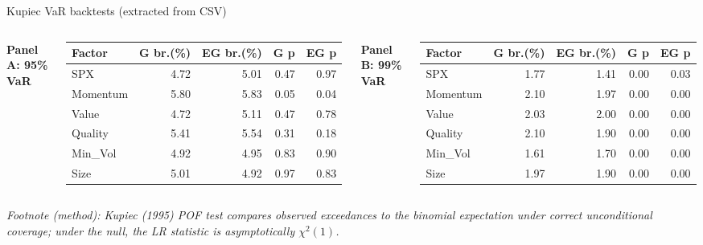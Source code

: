 \documentclass[10pt,aspectratio=169]{beamer}
\newcommand{\sm}{\small}
\newcommand{\xs}{\scriptsize}
\begin{document}
\begin{frame}{Kupiec VaR backtests (extracted from CSV)}
\sm
\begin{columns}[T,onlytextwidth]
\textbf{Panel A: 95\% VaR}
\vspace{1mm}
\begin{table}
\centering
\xs
\begin{tabular}{lrrrr}
\toprule
Factor & G br.(\%) & EG br.(\%) & G p & EG p\\
\midrule
SPX      & 4.72 & 5.01 & 0.47 & 0.97\\
Momentum & 5.80 & 5.83 & 0.05 & 0.04\\
Value    & 4.72 & 5.11 & 0.47 & 0.78\\
Quality  & 5.41 & 5.54 & 0.31 & 0.18\\
Min\_Vol & 4.92 & 4.95 & 0.83 & 0.90\\
Size     & 5.01 & 4.92 & 0.97 & 0.83\\
\bottomrule
\end{tabular}
\end{table}

\textbf{Panel B: 99\% VaR}
\vspace{1mm}
\begin{table}
\centering
\xs
\begin{tabular}{lrrrr}
\toprule
Factor & G br.(\%) & EG br.(\%) & G p & EG p\\
\midrule
SPX      & 1.77 & 1.41 & 0.00 & 0.03\\
Momentum & 2.10 & 1.97 & 0.00 & 0.00\\
Value    & 2.03 & 2.00 & 0.00 & 0.00\\
Quality  & 2.10 & 1.90 & 0.00 & 0.00\\
Min\_Vol & 1.61 & 1.70 & 0.00 & 0.00\\
Size     & 1.97 & 1.90 & 0.00 & 0.00\\
\bottomrule
\end{tabular}
\end{table}
\end{columns}

\vspace{1mm}
\xs\textit{Footnote (method): Kupiec (1995) POF test compares observed exceedances to the binomial expectation under correct unconditional coverage; under the null, the LR statistic is asymptotically \(\chi^2(1)\).}
\end{frame}

\end{document}
